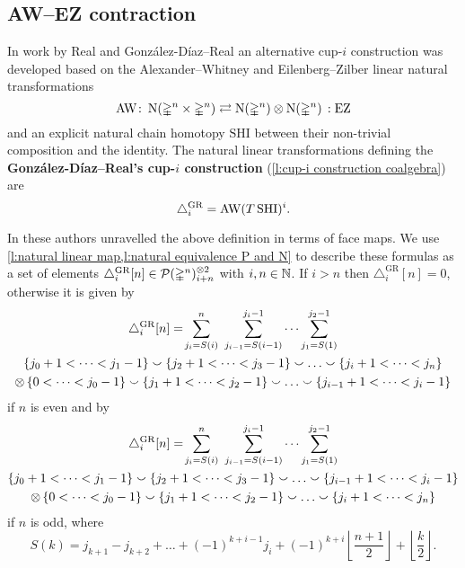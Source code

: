 \subsection{AW--EZ contraction} \label{ss:real}

In work by Real \cite{real1996computability} and Gonz\'alez-D\'iaz--Real \cite{gonzalez-diaz1999steenrod, gonzalez2003computation, gonzalez-diaz2005cocyclic}
an alternative \mbox{cup-$i$} construction was developed based on the Alexander--Whitney and Eilenberg--Zilber linear natural transformations
\[
\operatorname{AW} \colon \operatorname{N}(\mathbb{\Delta}^n \times \mathbb{\Delta}^n)
\rightleftarrows
\operatorname{N}(\mathbb{\Delta}^n) \otimes \operatorname{N}(\mathbb{\Delta}^n) \,: \operatorname{EZ}
\]
and an explicit natural chain homotopy $\mathrm{SHI}$ between their non-trivial composition and the identity.
The natural linear transformations defining the \textbf{Gonz\'alez-D\'iaz--Real's \mbox{cup-$i$} construction} (\cref{l:cup-i construction coalgebra}) are
\[
\triangle^{\mathrm{GR}}_i = \operatorname{AW} (T \, \mathrm{SHI})^i.
\]

In \cite[Corollary 3.2]{gonzalez-diaz1999steenrod} these authors unravelled the above definition in terms of face maps.
We use \cref{l:natural linear map,l:natural equivalence P and N} to describe these formulas as a set of elements $\triangle_i^{\mathrm{GR}} [n] \in \mathcal{P}(\mathbb{\Delta}^n)^{\otimes 2}_{i+n}$ with $i,n \in \mathbb{N}$.
If $i > n$ then $\triangle_i^{\mathrm{GR}} [n] = 0$, otherwise it is given by
\begin{multline*}
\triangle^{\mathrm{GR}}_i [n] = \!
\sum_{j_i=S(i)}^{n} \ \sum_{j_{i-1}=S(i-1)}^{j_i-1} \dots \sum_{j_1=S(1)}^{j_2-1} \\
\{j_0+1 < \dots < j_1-1\} \union \{j_2+1 < \dots < j_3-1\} \union \dots \union \{j_i+1 < \dots < j_n\}\\ \ot \,
\{0 < \dots < j_0-1\} \union \{j_1+1 < \dots < j_2-1\} \union \dots \union \{j_{i-1}+1 < \dots < j_i-1\}
\end{multline*}
if $n$ is even and by
\begin{multline*}
\triangle^{\mathrm{GR}}_i [n] = \!
\sum_{j_i=S(i)}^{n} \ \sum_{j_{i-1}=S(i-1)}^{j_i-1} \dots \sum_{j_1=S(1)}^{j_2-1} \\
\{j_0+1 < \dots < j_1-1\} \union \{j_2+1 < \dots < j_3-1\} \union \dots \union \{j_{i-1}+1 < \dots < j_i-1\} \\ \ot \,
\{0 < \dots < j_0-1\} \union \{j_1+1 < \dots < j_2-1\} \union \dots \union \{j_i+1 < \dots < j_n\}
\end{multline*}
if $n$ is odd, where
\[
S(k) = j_{k+1} - j_{k+2} + \dots + (-1)^{k+i-1} j_i + (-1)^{k+i} \left\lfloor \frac{n+1}{2} \right\rfloor + \left\lfloor \frac{k}{2} \right\rfloor .
\]

